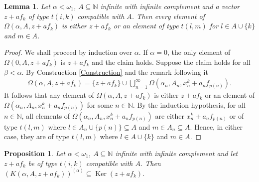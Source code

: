 \documentclass{amsart}
\newtheorem{lemma}[theorem]{Lemma}
\newtheorem{prop}[theorem]{Proposition}
\theoremstyle{definition}
\begin{document}
\begin{lemma} \label{Lemma:Typy}
    Let $\alpha < \omega_1$, $A \subseteq \mathbb{N}$ infinite with infinite complement and a vector $z + a f_k$ of type $t(i,k)$ compatible with $A$. Then every element of $\Omega(\alpha,A,z + af_k)$ is either $z + af_k$ or an element of type $t(l,m)$ for $l \in A \cup \{k\}$ and $m \in A$.
\end{lemma}

\begin{proof}
    We shall proceed by induction over $\alpha$. If $\alpha = 0$, the only element of $\Omega(0,A,z + af_k)$ is $z + af_k$ and the claim holds. Suppose the claim holds for all $\beta < \alpha$. By Construction \ref{Construction} and the remark following it
    \begin{align*}
        \Omega(\alpha,A,z + a f_k) = \{z + a f_k\} \cup \bigcup_{n=1}^\infty \Omega(\alpha_n,A_n,x^k_n + a_n f_{p(n)}).
    \end{align*}
    It follows that any element of $\Omega(\alpha,A,z + a f_k)$ is either $z + af_k$ or an element of $\Omega(\alpha_n,A_n,x^k_n + a_n f_{p(n)})$ for some $n \in \mathbb{N}$. By the induction hypothesis, for all $n \in \mathbb{N}$, all elements of $\Omega(\alpha_n,A_n,x^k_n + a_n f_{p(n)})$ are either $x^k_n + a_n f_{p(n)}$ or of type $t(l,m)$ where $l \in A_n \cup \{p(n)\} \subseteq A$ and $m \in A_n \subseteq A$. Hence, in either case, they are of type $t(l,m)$ where $l \in A \cup \{k\}$ and $m \in A$.
\end{proof}

\begin{prop} \label{Proposition:Rovnost}
    Let $\alpha < \omega_1$, $A \subseteq \mathbb{N}$ infinite with infinite complement and let $z + a f_k$ be of type $t(i,k)$ compatible with $A$. Then $\left(K(\alpha,A,z + a f_k) \right)^{(\alpha)} \subseteq \operatorname{Ker}(z + a f_k)$.
\end{prop}
\end{document}
